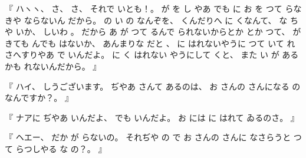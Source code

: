 %
『
ハヽヽ、
%
さ、
%
さ、
%
それで
いとも！。
%
が
を
し
やあ
でも
に
お
を
つて
らなきや
ならないん
だから。
%
の
い
の
なんぞを、
%
くんだりへ
に
くなんて、
%
な
ちや
いか、
%
しいわ
。
%
%
だから
あ
が
つて
るんで
られないからとか
とか
つて、
%
が
きても
んでも
はないか、
%
あんまりな
だと
%
、
%
%
に
はれないやうに
つて
いて
れさへすりやあ
で
いんだよ。
%
に
く
はれない
やうにして
くと、
%
また
い
が
あるかも
れないんだから。
』

%
『
ハイ、
%
しうございます。
%
ぢやあ
さんて
あるのは、
%
お
さんの
さんになる%
の
なんですか？。
』

%
『
ナアに
ぢやあ
いんだよ、
%
でも
いんだよ。
%
お
には
に
はれて
ゐるのさ。
』

%
『
ヘエー、
%
だか
が
らないの。
%
それぢや
の
で
お
さんの
さんに%
なさらうと
つて
らつしやる
な
%
の？。
』

